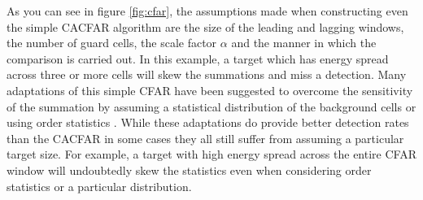 \documentclass[journal]{IEEEtran}
\begin{document}
\par As you can see in figure \ref{fig:cfar}, the assumptions made when constructing even the simple CACFAR algorithm are the size of the leading and lagging windows, the number of guard cells, the scale factor $\alpha$ and the manner in which the comparison is carried out. In this example, a target which has energy spread across three or more cells will skew the summations and miss a detection. Many adaptations of this simple CFAR have been suggested to overcome the sensitivity of the summation by assuming a statistical distribution of the background cells or using order statistics \cite{sayed} \cite{shyam}. While these adaptations do provide better detection rates than the CACFAR in some cases they all still suffer from assuming a particular target size. For example, a target with high energy spread across the entire CFAR window will undoubtedly skew the statistics even when considering order statistics or a particular distribution.
\end{document}

